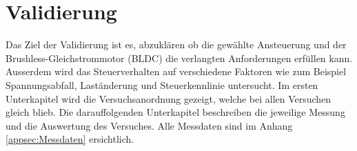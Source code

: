 \section{Validierung}\label{sec:Validierung}
Das Ziel der Validierung ist es, abzuklären ob die gewählte Ansteuerung und der Brushless-Gleichstrommotor (BLDC) die verlangten Anforderungen erfüllen kann. Ausserdem wird das Steuerverhalten auf verschiedene Faktoren wie zum Beispiel Spannungsabfall, Laständerung und Steuerkennlinie untersucht.
Im ersten Unterkapitel wird die Versuchsanordnung gezeigt, welche bei allen Versuchen gleich blieb. Die darauffolgenden Unterkapitel beschreiben die jeweilige Messung und die Auswertung des Versuches.
Alle Messdaten sind im Anhang \ref{appsec:Messdaten} ersichtlich.











